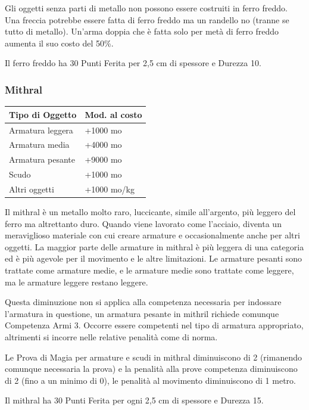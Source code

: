 \begin{multicols}{2}
Gli oggetti senza parti di metallo non possono essere costruiti in ferro freddo. Una freccia potrebbe essere fatta di ferro freddo ma un randello no (tranne se tutto di metallo). Un'arma doppia che è fatta solo per metà di ferro freddo aumenta il suo costo del 50\%.

Il ferro freddo ha 30 Punti Ferita per 2,5 cm di spessore e Durezza 10.

\subsubsection{Mithral}

\label{mithral}

\noindent\begin{tabularx}{\linewidth}{Xl}
	\toprule
\textbf{Tipo di Oggetto} & \textbf{Mod. al costo}\\
\toprule
Armatura leggera & +1000 mo\\
Armatura media & +4000 mo\\
Armatura pesante & +9000 mo\\
Scudo & +1000 mo\\
Altri oggetti & +1000 mo/kg
\end{tabularx}

\medskip

Il mithral è un metallo molto raro, luccicante, simile all'argento, più leggero del ferro ma altrettanto duro. Quando viene lavorato come l'acciaio, diventa un meraviglioso materiale con cui creare armature e occasionalmente anche per altri oggetti. La maggior parte delle armature in mithral è più leggera di una categoria ed è più agevole per il movimento e le altre limitazioni. Le armature pesanti sono trattate come armature medie, e le armature medie sono trattate come leggere, ma le armature leggere restano leggere.

Questa diminuzione non si applica alla competenza necessaria per indossare l'armatura in questione, un armatura pesante in mithril richiede comunque Competenza Armi 3. Occorre essere competenti nel tipo di armatura appropriato, altrimenti si incorre nelle relative penalità come di norma.

Le Prova di Magia per armature e scudi in mithral diminuiscono di 2 (rimanendo comunque necessaria la prova) e la penalità alla prove competenza diminuiscono di 2 (fino a un minimo di 0), le penalità al movimento diminuiscono di 1 metro.

Il mithral ha 30 Punti Ferita per ogni 2,5 cm di spessore e Durezza 15.


\end{multicols}
